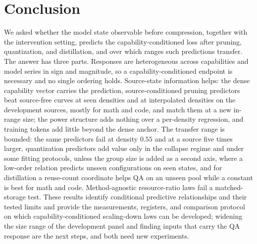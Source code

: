 \section{Conclusion}
\label{sec:conclusion}

We asked whether the model state observable before compression,
together with the intervention setting, predicts the
capability-conditioned loss after pruning, quantization, and
distillation, and over which ranges such predictions transfer. The
answer has three parts. Responses are heterogeneous across
capabilities and model series in sign and magnitude, so a
capability-conditioned endpoint is necessary and no single ordering
holds. Source-state information helps: the dense capability vector
carries the prediction, source-conditioned pruning predictors beat
source-free curves at seen densities and at interpolated densities on
the development sources, mostly for math and code, and match them at a
new in-range size; the power structure adds nothing over a per-density
regression, and training tokens add little beyond the dense anchor. The
transfer range is bounded: the same predictors fail at density $0.55$
and at a source five times larger, quantization predictors add value
only in the collapse regime and under some fitting protocols, unless
the group size is added as a second axis, where a low-order relation
predicts unseen configurations on seen states, and for
distillation a reuse-count coordinate helps QA on an unseen pool while
a constant is best for math and code. Method-agnostic resource-ratio
laws fail a matched-storage test. These results identify conditional
predictive relationships and their tested limits and provide the
measurements, registers, and comparison protocol on which
capability-conditioned scaling-down laws can be developed; widening
the size range of the development panel and finding inputs that carry
the QA response are the next steps, and both need new experiments.
